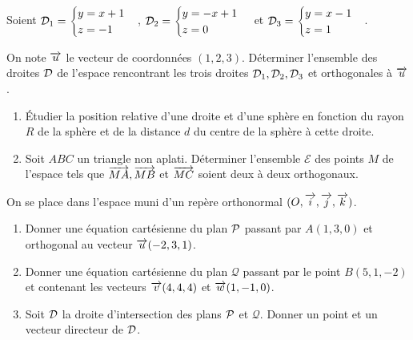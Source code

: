 \begin{exercice}
  Soient \(\Dr_1 =
  \begin{cases}
    y = x + 1 \\
    z = -1
  \end{cases}
  \),
  \(\Dr_2 =
  \begin{cases}
    y = -x + 1 \\
    z = 0
  \end{cases}
  \) et \(\Dr_3 =
  \begin{cases}
    y = x - 1 \\
    z = 1
  \end{cases}
\).

  On note \(\vu\) le vecteur de coordonnées \((1, 2, 3)\). Déterminer
  l'ensemble des droites \(\Dr\) de l'espace rencontrant les trois droites
  \(\Dr_1, \Dr_2, \Dr_3\) et orthogonales à \(\vu\).
\end{exercice}

\begin{exercice}
  \begin{enumerate}
    \item Étudier la position relative d'une droite et d'une sphère en
      fonction du rayon \(R\) de la sphère et de la distance \(d\) du centre
      de la sphère à cette droite.
    \item Soit \(ABC\) un triangle non aplati. Déterminer l'ensemble
      \(\mathcal{E}\) des points \(M\) de l'espace tels que \(\vect{MA},
      \vect{MB}\) et  \(\vect{MC}\) soient deux à deux orthogonaux.
  \end{enumerate}
\end{exercice}

\begin{exercice}
  On se place dans l'espace muni d'un repère orthonormal \((O, \vi, \vj,
  \vk)\).
  \begin{enumerate}
    \item Donner une équation cartésienne du plan \(\P\) passant par \(A(1,
      3, 0)\) et orthogonal au vecteur \(\vu(-2, 3, 1)\).
    \item Donner une équation cartésienne du plan \(\mathcal{Q}\) passant
      par le point \(B(5, 1, -2)\) et contenant les vecteurs \(\vv(4, 4,
      4)\) et \(\vw(1, -1, 0)\).
    \item Soit \(\Dr\) la droite d'intersection des plans \(\P\) et
      \(\mathcal{Q}\). Donner un point et un vecteur directeur de \(\Dr\).
  \end{enumerate}
\end{exercice}

